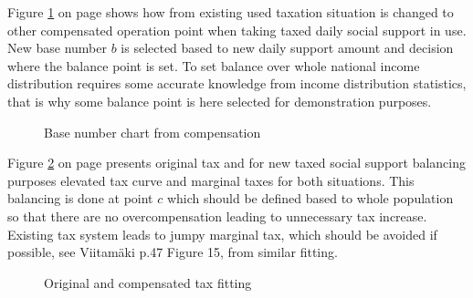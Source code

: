 Figure \ref{fig:B2b1cris} on page \pageref{fig:B2b1cris} shows how from
existing used taxation situation is changed to other compensated operation
point when taking taxed daily social support in use. New base number $b$ is
selected based to new daily support amount and decision where the balance
point is set. To set balance over whole national income distribution requires
some accurate knowledge from income distribution statistics, that is why some
balance point is here selected for demonstration purposes.
\begin{figure} %
 \begin{center}
  \caption{Base number chart from compensation}
  \label{fig:B2b1cris} 
 \end{center}
\end{figure}

Figure \ref{fig:BaseComp} on page \pageref{fig:BaseComp} presents original tax
and for new taxed social support balancing purposes elevated tax curve and
marginal taxes for both situations. This balancing is done at point $c$ which
should be defined based to whole population so that there are no
overcompensation leading to unnecessary tax increase. Existing tax system
leads to jumpy marginal tax, which should be avoided if possible, see
Viitam\"aki\allowbreak\cite{VM_46_2019} p.47 Figure 15, from similar fitting.
\begin{figure} %
 \begin{center}
  \caption{Original and compensated tax fitting}
  \label{fig:BaseComp} 
 \end{center}
\end{figure}

